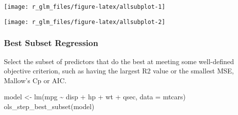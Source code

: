 \documentclass[
]{article}
\newenvironment{Shaded}{\begin{snugshade}}{\end{snugshade}}
\newcommand{\AttributeTok}[1]{\textcolor[rgb]{0.77,0.63,0.00}{#1}}
\newcommand{\FunctionTok}[1]{\textcolor[rgb]{0.00,0.00,0.00}{#1}}
\newcommand{\NormalTok}[1]{#1}
\newcommand{\OtherTok}[1]{\textcolor[rgb]{0.56,0.35,0.01}{#1}}
\newcommand{\SpecialCharTok}[1]{\textcolor[rgb]{0.00,0.00,0.00}{#1}}
\begin{document}
\begin{center}\texttt{[image: r\_glm\_files/figure-latex/allsubplot-1]} \end{center}

\begin{center}\texttt{[image: r\_glm\_files/figure-latex/allsubplot-2]} \end{center}

\hypertarget{best-subset-regression}{%
\subsubsection{Best Subset Regression}\label{best-subset-regression}}

Select the subset of predictors that do the best at meeting some
well-defined objective criterion, such as having the largest R2 value or
the smallest MSE, Mallow's Cp or AIC.

\begin{Shaded}
\begin{Highlighting}[]
\NormalTok{model }\OtherTok{\textless{}{-}} \FunctionTok{lm}\NormalTok{(mpg }\SpecialCharTok{\textasciitilde{}}\NormalTok{ disp }\SpecialCharTok{+}\NormalTok{ hp }\SpecialCharTok{+}\NormalTok{ wt }\SpecialCharTok{+}\NormalTok{ qsec, }\AttributeTok{data =}\NormalTok{ mtcars)}
\FunctionTok{ols\_step\_best\_subset}\NormalTok{(model)}
\end{Highlighting}
\end{Shaded}
\end{document}
